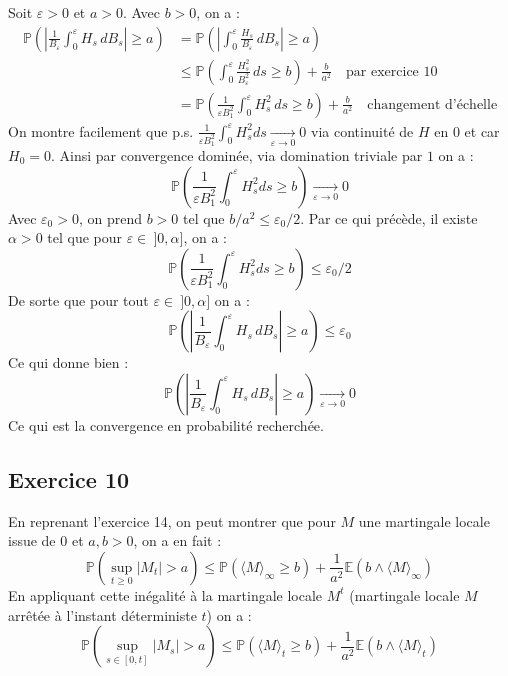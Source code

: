 \documentclass[a4paper,12pt]{article}
\newcommand{\E}{\mathbb{E}}
\newcommand{\prob}{\mathbb{P}}
\begin{document}
Soit $\varepsilon >0$ et $a>0$. Avec $b >0$, on a :
\begin{align*}
\prob \left( \left| \frac{1}{B_{\varepsilon}} \int_0^{\varepsilon} H_s \, dB_s \right| \geq a \right) 
& = \prob \left( \left| \int_0^{\varepsilon} \frac{H_s}{B_{\varepsilon}} \, dB_s \right| \geq a \right) \\
& \leq \prob \left( \int_0^{\varepsilon} \frac{H_s^2}{B_{\varepsilon}^2} \, ds \geq b \right) + \frac{b}{a^2} \quad \text{par exercice 10} \\
& = \prob \left( \frac{1}{\varepsilon B_1^2} \int_0^{\varepsilon} H_s^2 \, ds \geq b \right) + \frac{b}{a^2} \quad \text{changement d'échelle}
\end{align*}
On montre facilement que p.s. $\frac{1}{\varepsilon B_1^2} \int_0^{\varepsilon} H_s^2 ds \xrightarrow[\varepsilon \rightarrow 0]{} 0$ via continuité de $H$ en $0$ et car $H_0=0$. Ainsi par convergence dominée, via domination triviale par $1$ on a :
$$ \prob \left( \frac{1}{\varepsilon B_1^2} \int_0^{\varepsilon} H_s^2 ds \geq b \right) \xrightarrow[\varepsilon \rightarrow 0]{} 0$$
Avec $\varepsilon_0 >0$, on prend $b >0$ tel que $b/a^2 \leq \varepsilon_0/2$. Par ce qui précède, il existe $\alpha >0$ tel que pour $\varepsilon \in \ ]0, \alpha]$, on a :
$$ \prob \left( \frac{1}{\varepsilon B_1^2} \int_0^{\varepsilon} H_s^2 ds \geq b \right) \leq \varepsilon_0/2$$
De sorte que pour tout $\varepsilon \in \ ]0, \alpha]$ on a :
$$\prob \left( \left| \frac{1}{B_{\varepsilon}} \int_0^{\varepsilon} H_s \, dB_s \right| \geq a \right) \leq \varepsilon_0$$
Ce qui donne bien : 
$$\prob \left( \left| \frac{1}{B_{\varepsilon}} \int_0^{\varepsilon} H_s \, dB_s \right| \geq a \right) \xrightarrow[\varepsilon \rightarrow 0]{} 0$$
Ce qui est la convergence en probabilité recherchée. \\

\subsection{Exercice 10}
En reprenant l'exercice 14, on peut montrer que pour $M$ une martingale locale issue de $0$ et $a,b >0$, on a en fait : 
$$\prob \left( \sup_{t \geq 0} |M_t| > a \right) \leq \prob \left( \langle M \rangle_{\infty} \geq b \right) + \frac{1}{a^2} \E \left( b \wedge \langle M \rangle_{\infty} \right)$$
En appliquant cette inégalité à la martingale locale $M^t$ (martingale locale $M$ arrêtée à l'instant déterministe $t$) on a :
$$\prob \left( \sup_{s \in [0,t]} |M_s| > a \right) \leq \prob \left( \langle M \rangle_{t} \geq b \right) + \frac{1}{a^2} \E \left( b \wedge \langle M \rangle_{t} \right)$$
\end{document}
